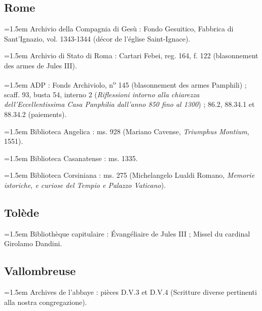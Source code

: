 \documentclass[12pt,twoside,openany]{book}
\newenvironment{PurhBibliography}
  {%
    \par
    \setlength{\parindent}{0pt}%
    \setlength{\leftskip}{0pt}%
  }
  {%
    \par
  }
\begin{document}
\subsection{Rome}

\begin{PurhBibliography}
\noindent\hangindent=1.5em Archivio della Compagnia di Gesù : Fondo Gesuitico, Fabbrica di Sant’Ignazio, vol. 1343-1344 (décor de l’église Saint-Ignace).\par
\noindent\hangindent=1.5em Archivio di Stato di Roma : Cartari Febei, reg. 164, f. 122 (blasonnement des armes de Jules \textsc{III}).\par
\noindent\hangindent=1.5em ADP : Fonds Archiviolo, n\textsuperscript{o} 145 (blasonnement des armes Pamphili) ; scaff. 93, busta 54, interno 2 (\textit{Riflessioni intorno alla chiarezza dell’Eccellentissima Casa Panphilia dall’anno 850 fino al 1300}) ; 86.2, 88.34.1 et 88.34.2 (paiements).\par
\noindent\hangindent=1.5em Biblioteca Angelica : ms. 928 (Mariano Cavense, \textit{Triumphus Montium}, 1551).\par
\noindent\hangindent=1.5em Biblioteca Casanatense : ms. 1335.\par
\noindent\hangindent=1.5em Biblioteca Corsiniana : ms. 275 (Michelangelo Lualdi Romano, \textit{Memorie istoriche, e curiose del Tempio e Palazzo Vaticano}).\par
\end{PurhBibliography}

\subsection{Tolède}

\begin{PurhBibliography}
\noindent\hangindent=1.5em Bibliothèque capitulaire : Évangéliaire de Jules \textsc{III} ; Missel du cardinal Girolamo Dandini.\par
\end{PurhBibliography}

\subsection{Vallombreuse}

\begin{PurhBibliography}
\noindent\hangindent=1.5em Archives de l’abbaye : pièces D.V.3 et D.V.4 (Scritture diverse pertinenti alla nostra congregazione).\par
\end{PurhBibliography}
\end{document}
